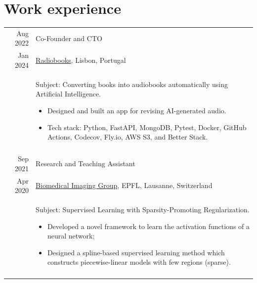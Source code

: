 \documentclass[a4paper,11pt]{article}
\def\datespace{-2pt}
\def\title-main-sep{4pt}
\def\tabwidth{13cm}
\begin{document}

  \newpage

  \section{Work experience}

    \begin{tabular}{r|p{\tabwidth}}

      {\small Aug 2022} & Co-Founder and CTO \\[\datespace]
      {\small Jan 2024} & {\small \href{https://radiobooks.webflow.io/}{Radiobooks}, Lisbon, Portugal} \\[\title-main-sep]
      & {
      \parbox[t]{\tabwidth}{
      \footnotesize Subject: Converting books into audiobooks automatically using Artificial Intelligence.
      \begin{itemize}[topsep=0pt, partopsep=0pt, parsep=0pt, itemsep=0pt, leftmargin=*, after=\vspace{0pt}]
        \item Designed and built an app for revising AI-generated audio.
        \item Tech stack: Python, FastAPI, MongoDB, Pytest, Docker, GitHub Actions, Codecov, Fly.io, AWS S3, and Better Stack.
      \end{itemize}
      }
      } \\
      \multicolumn{2}{c}{} \\


      {\small Sep 2021} 	& Research and Teaching Assistant \\[\datespace]
      {\small Apr 2020} 	& {\small \href{https://bigwww.epfl.ch/}{Biomedical Imaging Group}, EPFL, Lausanne, Switzerland} \\[\title-main-sep]
      & {
        \parbox[t]{\tabwidth}{
        \footnotesize Subject: Supervised Learning with Sparsity-Promoting Regularization.
        \begin{itemize}[topsep=0pt, partopsep=0pt, parsep=0pt, itemsep=0pt, leftmargin=*, after=\vspace{0pt}]
          \item Developed a novel framework to learn the activation functions of a neural network;
          \item Designed a spline-based supervised learning method which constructs piecewise-linear models with few regions (sparse).
        \end{itemize}
        }
      } \\
      \multicolumn{2}{c}{} \\


\end{tabular}
\end{document}
